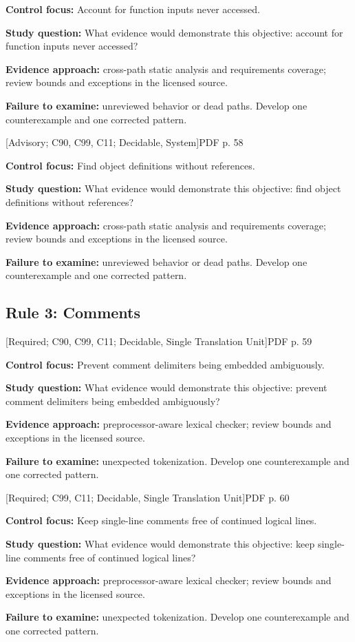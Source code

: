 \documentclass[10pt,letterpaper]{article}
\begin{document}
\textbf{Control focus:} Account for function inputs never accessed.\par
\textbf{Study question:} What evidence would demonstrate this objective: account for function inputs never accessed?\par
\textbf{Evidence approach:} cross-path static analysis and requirements coverage; review bounds and exceptions in the licensed source.\par
\textbf{Failure to examine:} unreviewed behavior or dead paths. Develop one counterexample and one corrected pattern.\par
\smallskip
{}
 \textsf{\footnotesize [Advisory; C90, C99, C11; Decidable, System]}\hfill{\footnotesize PDF p. 58}\par
\textbf{Control focus:} Find object definitions without references.\par
\textbf{Study question:} What evidence would demonstrate this objective: find object definitions without references?\par
\textbf{Evidence approach:} cross-path static analysis and requirements coverage; review bounds and exceptions in the licensed source.\par
\textbf{Failure to examine:} unreviewed behavior or dead paths. Develop one counterexample and one corrected pattern.\par
\smallskip
\subsection{Rule 3: Comments}
 \textsf{\footnotesize [Required; C90, C99, C11; Decidable, Single Translation Unit]}\hfill{\footnotesize PDF p. 59}\par
\textbf{Control focus:} Prevent comment delimiters being embedded ambiguously.\par
\textbf{Study question:} What evidence would demonstrate this objective: prevent comment delimiters being embedded ambiguously?\par
\textbf{Evidence approach:} preprocessor-aware lexical checker; review bounds and exceptions in the licensed source.\par
\textbf{Failure to examine:} unexpected tokenization. Develop one counterexample and one corrected pattern.\par
\smallskip
{}
 \textsf{\footnotesize [Required; C99, C11; Decidable, Single Translation Unit]}\hfill{\footnotesize PDF p. 60}\par
\textbf{Control focus:} Keep single-line comments free of continued logical lines.\par
\textbf{Study question:} What evidence would demonstrate this objective: keep single-line comments free of continued logical lines?\par
\textbf{Evidence approach:} preprocessor-aware lexical checker; review bounds and exceptions in the licensed source.\par
\textbf{Failure to examine:} unexpected tokenization. Develop one counterexample and one corrected pattern.\par
\smallskip
\end{document}

